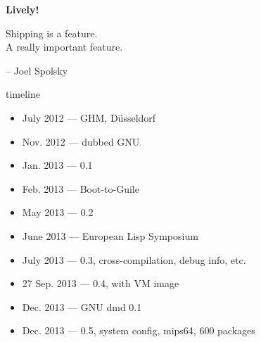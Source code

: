 \documentclass{beamer}
\begin{document}




\begin{frame}[plain]
  \begin{centering}
    \Huge{\textbf{Lively!}}
  \end{centering}
\end{frame}

\begin{frame}[plain]
  \vspace{2cm}
  \textrm{\LARGE{%
      Shipping is a feature.\\
      A really important feature.
    }}
  
  \vspace{2cm}
  \hfill{-- Joel Spolsky}
\end{frame}

\begin{frame}{timeline}
  \begin{itemize}
    \item July 2012 --- GHM, Düsseldorf
    \item Nov. 2012 --- dubbed GNU
    \item{Jan. 2013 --- \alert{0.1}}
    \item{Feb. 2013 --- Boot-to-Guile}
    \item{May 2013 --- \alert{0.2}}
    \item{June 2013 --- European Lisp Symposium}
    \item{July 2013 --- \alert{0.3}, cross-compilation, debug info, etc.}
    \item{27 Sep. 2013 --- \alert{0.4}, with VM image}
    \item{Dec. 2013 --- \alert{GNU dmd} 0.1}
    \item{Dec. 2013 --- \alert{0.5}, system config, mips64, 600 packages}
  \end{itemize}
\end{frame}
\end{document}
